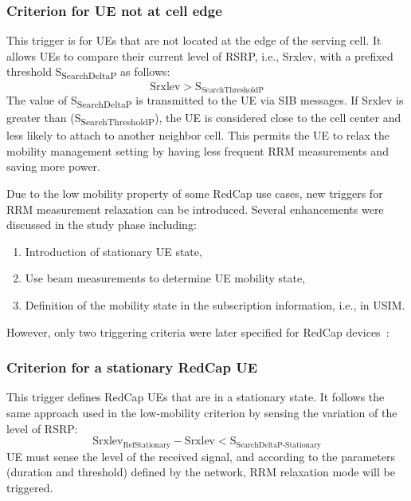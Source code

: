\documentclass[]{IEEEtran}
\begin{document}
\subsubsection*{\textbf{Criterion for UE not at cell edge}}
This trigger is for UEs that are not located at the edge of the serving cell.
It allows UEs to compare their current level of RSRP, i.e., Srxlev, with a prefixed threshold S\textsubscript{SearchDeltaP} as follows:
\begin{equation}
\textrm{Srxlev}>\textrm{S}_{\textrm{SearchThresholdP}}
\label{equ:not-at-the-edge-criterion}
\end{equation}
The value of S\textsubscript{SearchDeltaP} is transmitted to the UE via SIB messages.
If Srxlev is greater than (S\textsubscript{SearchThresholdP}), the UE is considered close to the cell center and less likely to attach to another neighbor cell.
This permits the UE to relax the mobility management setting by having less frequent RRM measurements and saving more power.

Due to the low mobility property of some RedCap use cases, new triggers for RRM measurement relaxation can be introduced. Several enhancements were discussed in the study phase including:
\begin{enumerate}
    \item Introduction of stationary UE state,
    \item Use beam measurements to determine UE mobility state,
    \item Definition of the mobility state in the subscription information, i.e., in USIM.
\end{enumerate}
However, only two triggering criteria were later specified for RedCap devices~\cite{3gpp_nr_2022-10_38.304}:

\subsubsection*{\textbf{Criterion for a stationary RedCap UE}}
This trigger defines RedCap UEs that are in a stationary state.
It follows the same approach used in the low-mobility criterion by sensing the variation of the level of RSRP:
\begin{equation}
\textrm{Srxlev}_{\textrm{RefStationary}}-\textrm{Srxlev}<\textrm{S}_{\textrm{SearchDeltaP-Stationary}}
\label{equ:stationary-criterion}
\end{equation}
UE must sense the level of the received signal, and according to the parameters (duration and threshold) defined by the network, RRM relaxation mode will be triggered. 
\end{document}
